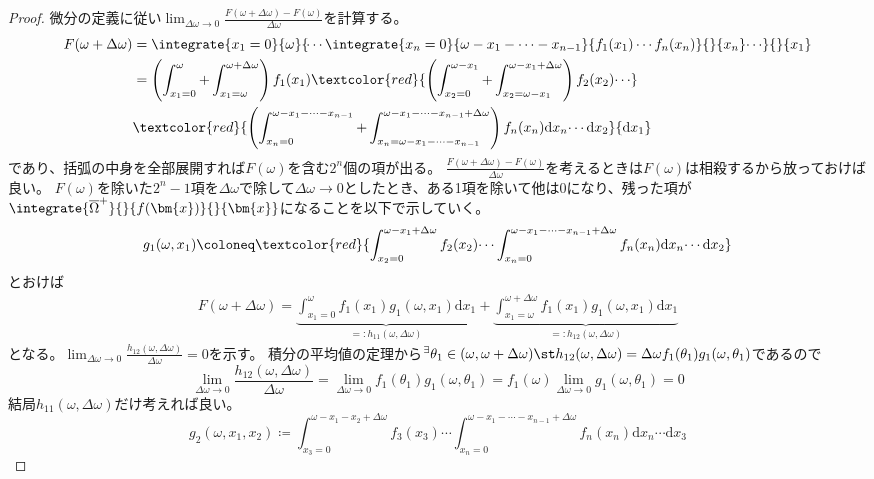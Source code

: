         \begin{proof}
            \quad\par
            \newcommand{\domega}{{\Delta\omega}}
            \renewcommand{\d}[1]{{\mathrm{d}#1}}
            微分の定義に従い$\lim_{\domega \to 0}\frac{F(\omega+\domega)-F(\omega)}{\domega}$を計算する。
            \begin{align*}
                F(\omega+\domega) &= \integrate{x_1=0}{\omega}{\dotsi\integrate{x_n=0}{\omega-x_1-\dotsb-x_{n-1}}{f_1(x_1)\dotsm f_n(x_n)}{}{x_n}\dotsi}{}{x_1} \\
                &= \left(\int_{x_1=0}^\omega+\int_{x_1=\omega}^{\omega+\domega}\right)f_1(x_1)\textcolor{red}{\left(\int_{x_2=0}^{\omega-x_1}+\int_{x_2=\omega-x_1}^{\omega-x_1+\domega}\right)f_2(x_2)\dotsi}\\
                & \textcolor{red}{\left(\int_{x_n=0}^{\omega-x_1-\dotsb-x_{n-1}}+\int_{x_n=\omega-x_1-\dotsb-x_{n-1}}^{\omega-x_1-\dotsb-x_{n-1}+\domega}\right)f_n(x_n)\d{x_n}\dotsi\d{x_2}}\d{x_1}
            \end{align*}
            であり、括弧の中身を全部展開すれば$F(\omega)$を含む$2^n$個の項が出る。
            $\frac{F(\omega+\domega)-F(\omega)}{\domega}$を考えるときは$F(\omega)$は相殺するから放っておけば良い。
            $F(\omega)$を除いた$2^n-1$項を$\domega$で除して$\domega \to 0$としたとき、ある1項を除いて他は0になり、残った項が$\integrate{\overline{\Omega}^+}{}{f(\bm{x})}{}{\bm{x}}$になることを以下で示していく。
            \[g_1(\omega,x_1) \coloneq \textcolor{red}{\int_{x_2=0}^{\omega-x_1+\domega}f_2(x_2)\dotsi\int_{x_n=0}^{\omega-x_1-\dotsb-x_{n-1}+\domega}f_n(x_n)\d{x_n}\dotsi\d{x_2}}\]
            とおけば
            \begin{align*}
                F(\omega+\domega) = \underbrace{\int_{x_1=0}^{\omega}f_1(x_1)g_1(\omega,x_1)\d{x_1}}_{=:h_{11}(\omega,\domega)} + \underbrace{\int_{x_1=\omega}^{\omega+\domega}f_1(x_1)g_1(\omega,x_1)\d{x_1}}_{=:h_{12}(\omega,\domega)}
            \end{align*}
            となる。$\lim_{\domega\to 0}\frac{h_{12}(\omega,\domega)}{\domega}=0$を示す。
            積分の平均値の定理から$^\exists\theta_1 \in (\omega,\omega+\domega)\st h_{12}(\omega,\domega)=\domega f_1(\theta_1)g_1(\omega,\theta_1)$であるので
            \[\lim_{\domega\to 0}\frac{h_{12}(\omega,\domega)}{\domega} = \lim_{\domega\to 0}f_1(\theta_1)g_1(\omega,\theta_1) = f_1(\omega)\lim_{\domega\to 0}g_1(\omega,\theta_1) = 0\]
            結局$h_{11}(\omega,\domega)$だけ考えれば良い。
            \[g_2(\omega,x_1,x_2) \coloneq \int_{x_3=0}^{\omega-x_1-x_2+\domega}f_3(x_3)\dotsi\int_{x_n=0}^{\omega-x_1-\dotsb-x_{n-1}+\domega}f_n(x_n)\d{x_n}\dotsi\d{x_3}\]

\end{proof}
